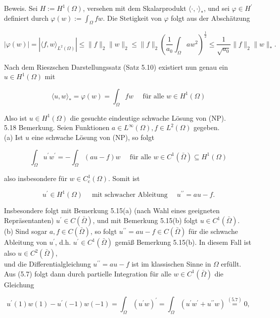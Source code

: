\documentclass[10pt, letterpaper]{article}
\begin{document}
Beweis. Sei $H:=H^{1}(\Omega)$, versehen mit dem Skalarprodukt $\langle\cdot, \cdot\rangle_{*}$, und sei $\varphi \in H^{\prime}$ definiert durch $\varphi(w):=\int_{\Omega} f w$. Die Stetigkeit von $\varphi$ folgt aus der Abschätzung

$$
|\varphi(w)|=\left|\langle f, w\rangle_{L^{2}(\Omega)}\right| \leq\|f\|_{2}\|w\|_{2} \leq\|f\|_{2}\left(\frac{1}{a_{0}} \int_{\Omega} a w^{2}\right)^{\frac{1}{2}} \leq \frac{1}{\sqrt{a_{0}}}\|f\|_{2}\|w\|_{*} .
$$

Nach dem Rieszschen Darstellungssatz (Satz 5.10) existiert nun genau ein $u \in H^{1}(\Omega)$ mit

$$
\langle u, w\rangle_{*}=\varphi(w)=\int_{\Omega} f w \quad \text { für alle } w \in H^{1}(\Omega)
$$

Also ist $u \in H^{1}(\Omega)$ die gesuchte eindeutige schwache Lösung von (NP).\\
5.18 Bemerkung. Seien Funktionen $a \in L^{\infty}(\Omega), f \in L^{2}(\Omega)$ gegeben.\\
(a) Ist $u$ eine schwache Lösung von (NP), so folgt

$$
\int_{\Omega} u^{\prime} w^{\prime}=-\int_{\Omega}(a u-f) w \quad \text { für alle } w \in C^{1}(\bar{\Omega}) \subseteq H^{1}(\Omega)
$$

also insbesondere für $w \in C_{\mathrm{c}}^{1}(\Omega)$. Somit ist

$$
u^{\prime} \in H^{1}(\Omega) \quad \text { mit schwacher Ableitung } \quad u^{\prime \prime}=a u-f .
$$

Insbesondere folgt mit Bemerkung 5.15(a) (nach Wahl eines geeigneten Repräsentanten) $u^{\prime} \in C(\bar{\Omega})$, und mit Bemerkung 5.15(b) folgt $u \in C^{1}(\bar{\Omega})$.\\
(b) Sind sogar $a, f \in C(\bar{\Omega})$, so folgt $u^{\prime \prime}=a u-f \in C(\bar{\Omega})$ für die schwache Ableitung von $u^{\prime}$, d.h. $u^{\prime} \in C^{1}(\bar{\Omega})$ gemäß Bemerkung 5.15(b). In diesem Fall ist also $u \in C^{2}(\bar{\Omega})$,\\
und die Differentialgleichung $u^{\prime \prime}=a u-f$ ist im klassischen Sinne in $\Omega$ erfüllt. Aus (5.7) folgt dann durch partielle Integration für alle $w \in C^{1}(\bar{\Omega})$ die Gleichung

$$
u^{\prime}(1) w(1)-u^{\prime}(-1) w(-1)=\int_{\Omega}\left(u^{\prime} w\right)^{\prime}=\int_{\Omega}\left(u^{\prime} w^{\prime}+u^{\prime \prime} w\right) \stackrel{(5.7)}{=} 0,
$$
\end{document}
